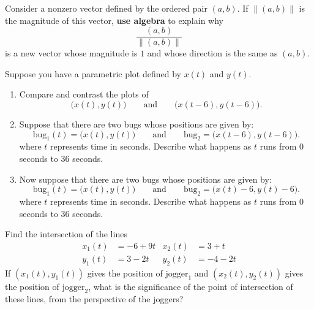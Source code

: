 \begin{prob} 
Consider a nonzero vector defined by the ordered pair $(a,b)$. If $\|
(a,b)\|$ is the magnitude of this vector, \textbf{use algebra} to
explain why
\[
\frac{(a,b)}{\|(a,b)\|}
\]
is a new vector whose magnitude is $1$ and whose direction is the same
as $(a,b)$.
\end{prob} 

\begin{prob}
Suppose you have a parametric plot defined by $x(t)$ and $y(t)$.
\begin{enumerate}
\item Compare and contrast the plots of
\[
\bigg(x(t),y(t)\bigg)\qquad\text{and}\qquad\bigg(x(t-6),y(t-6)\bigg).
\]
\item Suppose that there are two bugs whose positions are given by:
\[
\mathrm{bug}_1(t) = \bigg(x(t),y(t)\bigg)\qquad\text{and}\qquad\mathrm{bug}_2=\bigg(x(t-6),y(t-6)\bigg).
\]
where $t$ represents time in seconds. Describe what happens as $t$
runs from $0$ seconds to $36$ seconds.

\item Now suppose that there are two bugs whose positions are given
  by:
\[
\mathrm{bug}_1(t) = \bigg(x(t),y(t)\bigg)\qquad\text{and}\qquad\mathrm{bug}_2=\bigg(x(t)-6,y(t)-6\bigg).
\]
where $t$ represents time in seconds. Describe what happens as $t$
runs from $0$ seconds to $36$ seconds.
\end{enumerate}
\end{prob} 

\begin{prob}
Find the intersection of the lines
\begin{align*}
x_1(t) &= -6 + 9t & x_2(t) &= 3+t \\
y_1(t) &= 3-2t &  y_2(t) &= -4-2t 
\end{align*}
If $(x_1(t),y_1(t))$ gives the position of $\mathrm{jogger}_1$ and
$(x_2(t),y_2(t))$ gives the position of $\mathrm{jogger}_2$, what is
the significance of the point of intersection of these lines, from the
perspective of the joggers?
\end{prob}

